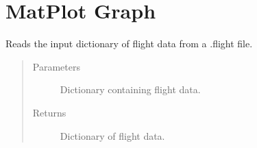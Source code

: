 \documentclass[letterpaper,10pt,english]{sphinxmanual}
\begin{document}
\chapter{MatPlot Graph}
\label{\detokenize{index:module-src.Views.Graph}}\label{\detokenize{index:matplot-graph}}

\begin{fulllineitems}
\label{\detokenize{index:src.Views.Graph.checkCoordinates}}
Reads the input dictionary of flight data from a .flight file.
\begin{quote}\begin{description}
\item[{Parameters}] \leavevmode
{} \textendash{} Dictionary containing flight data.

\item[{Returns}] \leavevmode
Dictionary of flight data.

\end{description}\end{quote}

\end{fulllineitems}

\end{document}
